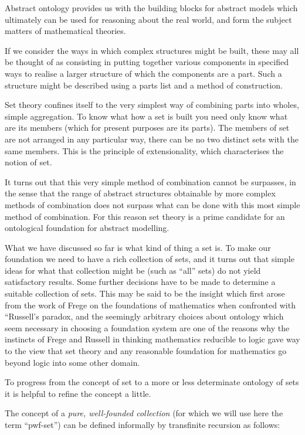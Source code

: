 \documentclass[numreferences]{rbjk}
\begin{document}
\begin{article}
Abstract ontology provides us with the building blocks for abstract models which ultimately can be used for reasoning about the real world, and form the subject matters of mathematical theories.

If we consider the ways in which complex structures might be built, these may all be thought of as consisting in putting together various components in specified ways to realise a larger structure of which the components are a part.
Such a structure might be described using a parts list and a method of construction.

Set theory confines itself to the very simplest way of combining parts into wholes, simple aggregation.
To know what how a set is built you need only know what are its members (which for present purposes are its parts).
The members of set are not arranged in any particular way, there can be no two distinct sets with the same members.
This is the principle of extensionality, which characterises the notion of set.

It turns out that this very simple method of combination cannot be surpasses, in the sense that the range of abstract structures obtainable by more complex methods of combination does not surpass what can be done with this most simple method of combination.
For this reason set theory is a prime candidate for an ontological foundation for abstract modelling.

What we have discussed so far is what kind of thing a set is.
To make our foundation we need to have a rich collection of sets, and it turns out that simple ideas for what that collection might be (such as ``all'' sets) do not yield satisfactory results.
Some further decisions have to be made to determine a suitable collection of sets.
This may be said to be the insight which first arose from the work of Frege on the foundations of mathematics when confronted with ``Russell's paradox, and the seemingly arbitrary choices about ontology which seem necessary in choosing a foundation system are one of the reasons why the instincts of Frege and Russell in thinking mathematics reducible to logic gave way to the view that set theory and any reasonable foundation for mathematics go beyond logic into some other domain.

To progress from the concept of set to a more or less determinate ontology of sets it is helpful to refine the concept a little.

The concept of a \emph{pure, well-founded collection} (for which we will use here the term ``pwf-set'') can be defined informally by transfinite recursion as follows:


\end{article}
\end{document}
